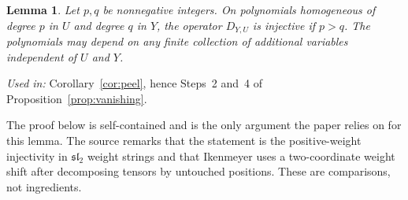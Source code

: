 \documentclass[11pt]{article}
\newtheorem{lemma}[theorem]{Lemma}
\theoremstyle{remark}
\newcommand{\D}[2]{D_{#1,#2}}
\begin{document}
\begin{lemma}\label{lem:shift}
Let $p,q$ be nonnegative integers. On polynomials homogeneous of degree $p$
in $U$ and degree $q$ in $Y$, the operator $\D{Y}{U}$ is injective if
$p>q$. The polynomials may depend on any finite collection of additional
variables independent of $U$ and $Y$.
\end{lemma}

\noindent\emph{Used in:} Corollary~\ref{cor:peel}, hence Steps~2 and~4 of
Proposition~\ref{prop:vanishing}.

The proof below is self-contained and is the only argument the paper relies
on for this lemma. The source remarks that the statement is the
positive-weight injectivity in $\mathfrak{sl}_2$ weight strings
\cite[Section~11.1, Claim~11.4 and equation~(11.5)]{FultonHarris} and that
Ikenmeyer \cite[Section~5, Claim~5.1]{Ikenmeyer} uses a two-coordinate
weight shift after decomposing tensors by untouched positions. These are
comparisons, not ingredients.
\end{document}
